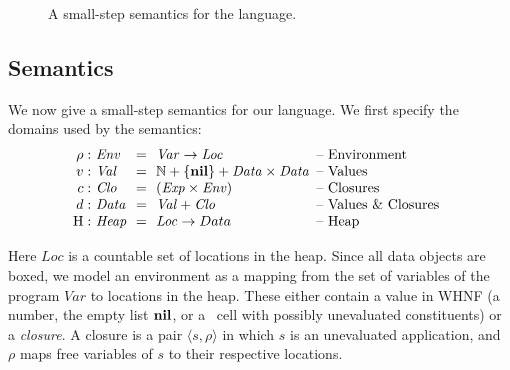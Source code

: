 \documentclass[9pt]{sigplanconf}
\begin{document}
\begin{figure*}[t!]
\begin{center}
\caption{A small-step semantics for the language. \label{fig:lang-semantics}}
\end{center}
\end{figure*}



\subsection{Semantics}
We now give  a small-step semantics for our  language.
We first specify the domains used by the semantics:
\[
\renewcommand{\arraystretch}{1}
\begin{array}{@{}r@{\ }l@{\ \ }c@{\ \ }l@{\hspace{0.5em}}l}
\rho: & \mathit{Env} &=&\mathit{Var} \rightarrow \mathit{Loc} & \mbox{-- Environment} \\
v:   & \mathit{Val} &=& \mathbb{N} + \{\NIL\} + \mathit{Data \times Data}& \mbox{-- Values}\\
c:   & \mathit{Clo} &=& \mathit{(Exp \times Env)}& \mbox{-- Closures}\\
d: & \mathit{Data} &=&\mathit{Val} + \mathit{Clo} & \mbox{-- Values \& Closures} \\
\heap: & \mathit{Heap} & =&\mathit{Loc} \rightarrow Data & \mbox{-- Heap}
\end{array}
\]

Here  $\mathit{Loc}$ is  a countable  set  of locations  in the  heap.
Since all data objects are boxed, we model an environment as a mapping
from the set  of variables of the program  $\mathit{Var}$ to locations
in the  heap.  These  either contain  a value in  WHNF (a  number, the
empty  list  $\mbox{$\mathbf{ nil}$}$,  or  a  \CONS\  cell  with  possibly  unevaluated
constituents) or  a {\em closure}.   A closure  is a pair  $\langle s,
\rho\rangle$ in  which $s$ is  an unevaluated application,  and $\rho$
maps free variables of $s$ to their respective locations.
\end{document}
